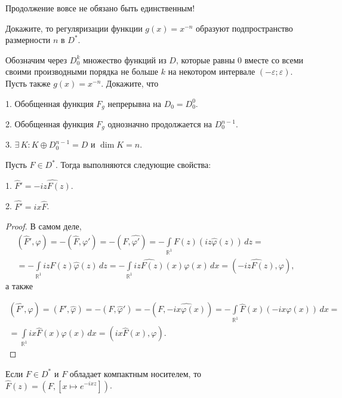 \documentclass[12pt,titlepage, a4paper]{article}
\begin{document}
\begin{zam}
Продолжение вовсе не обязано быть единственным!
\end{zam}

\begin{upr}
Докажите, то регуляризации функции $g(x)=x^{-n}$ образуют
подпространство размерности $n$ в $D^*$.
\end{upr}

\begin{upr}
Обозначим через $D_0^k$ множество функций из $D$, которые равны 0
вместе со всеми своими производными порядка не больше $k$ на
некотором интервале $(-\varepsilon;\varepsilon)$. Пусть также
$g(x)=x^{-n}$. Докажите, что

1. Обобщенная функция $F_g$ непрерывна на $D_0=D_0^0$.

2. Обобщенная функция $F_g$ однозначно продолжается на $D_0^{n-1}$.

3. $\exists\,K:K\oplus D_0^{n-1}=D$ и $\dim K=n$.
\end{upr}

\begin{theorem}
Пусть $F\in D^*$. Тогда выполняются следующие свойства:

1. $\hat{F}'=\widehat{-iz F(z)}$.

2. $\widehat{F'}=ix\hat{F}$.
\end{theorem}

\begin{proof}
В самом деле,
\begin{multline*}
(\hat{F}',\varphi)=-(\hat{F},\varphi')=-(F,\widehat{\varphi'})=-\int\limits_{\mathbb{R}^1}\!
F(z)(iz\hat{\varphi}(z))\,dz=\\=
-\int\limits_{\mathbb{R}^1}\!izF(z)\hat{\varphi}(z)\,dz=-\int\limits_{\mathbb{R}^1}\!
\widehat{izF(z)}(x)\varphi(x)\,dx=(\widehat{-izF(z)},\varphi),
\end{multline*}
а также

\begin{multline*}
(\widehat{F'},\varphi)=(F',\hat{\varphi})=-(F,\hat{\varphi}')=-(F,\widehat{-ix\varphi(x)})=
-\int\limits_{\mathbb{R}^1}\!\hat{F}(x)(-ix\varphi(x))\,dx=\\=
\int\limits_{\mathbb{R}^1}\!ix\hat{F}(x)\varphi(x)\,dx=(ix\hat{F}(x),\varphi).
\end{multline*}
\end{proof}

\begin{predl}
Если $F\in D^*$ и $F$ обладает компактным носителем, то
$\hat{F}(z)=(F,[x\mapsto e^{-ixz}])$.
\end{predl}
\end{document}
